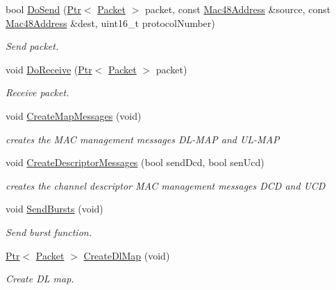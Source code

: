 \begin{DoxyCompactItemize}
bool \hyperlink{classns3_1_1BaseStationNetDevice_a36bfc962960554cb30c8f868fdf7b479}{Do\+Send} (\hyperlink{classns3_1_1Ptr}{Ptr}$<$ \hyperlink{classns3_1_1Packet}{Packet} $>$ packet, const \hyperlink{classns3_1_1Mac48Address}{Mac48\+Address} \&source, const \hyperlink{classns3_1_1Mac48Address}{Mac48\+Address} \&dest, uint16\+\_\+t protocol\+Number)
\begin{DoxyCompactList}\small\item\em Send packet. \end{DoxyCompactList}\item 
void \hyperlink{classns3_1_1BaseStationNetDevice_a0a6bf3deb17ab1adde07a1ed62875067}{Do\+Receive} (\hyperlink{classns3_1_1Ptr}{Ptr}$<$ \hyperlink{classns3_1_1Packet}{Packet} $>$ packet)
\begin{DoxyCompactList}\small\item\em Receive packet. \end{DoxyCompactList}\item 
void \hyperlink{classns3_1_1BaseStationNetDevice_a5bbf169891f8a3b28b952039ed63253f}{Create\+Map\+Messages} (void)
\begin{DoxyCompactList}\small\item\em creates the M\+AC management messages D\+L-\/\+M\+AP and U\+L-\/\+M\+AP \end{DoxyCompactList}\item 
void \hyperlink{classns3_1_1BaseStationNetDevice_a1f5099c76f920d64a0bd0fba2f9cccff}{Create\+Descriptor\+Messages} (bool send\+Dcd, bool sen\+Ucd)
\begin{DoxyCompactList}\small\item\em creates the channel descriptor M\+AC management messages D\+CD and U\+CD \end{DoxyCompactList}\item 
void \hyperlink{classns3_1_1BaseStationNetDevice_aff0dccc62470f6bd3c04fe8824b20454}{Send\+Bursts} (void)
\begin{DoxyCompactList}\small\item\em Send burst function. \end{DoxyCompactList}\item 
\hyperlink{classns3_1_1Ptr}{Ptr}$<$ \hyperlink{classns3_1_1Packet}{Packet} $>$ \hyperlink{classns3_1_1BaseStationNetDevice_ab03962233fca4f8e6581c87ce34b8170}{Create\+Dl\+Map} (void)
\begin{DoxyCompactList}\small\item\em Create DL map. \end{DoxyCompactList}\item 

\end{DoxyCompactItemize}
